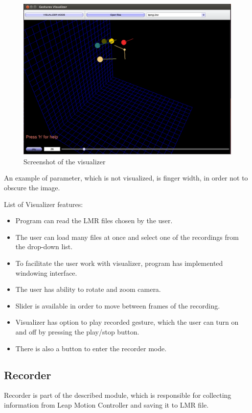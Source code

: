 \begin{figure}[htb]
\centering
 \includegraphics[width=1\columnwidth]{figures/visualizer.png}
 \caption{Screenshot of the visualizer}
 \label{visualizer}
\end{figure}

An example of parameter, which is not visualized, is finger width, in order not to obscure the image.

List of Visualizer features:
\begin{itemize}
\item Program can read the LMR files chosen by the user.
\item The user can load many files at once and select one of the recordings from the drop-down list.
\item To facilitate the user work with visualizer, program has implemented windowing interface.
\item The user has ability to rotate and zoom camera.
\item Slider is available in order to move between frames of the recording.
\item Visualizer has option to play recorded gesture, which the user can turn on and off by pressing the play/stop button.
\item There is also a button to enter the recorder mode.
\end{itemize}

\subsection{Recorder}
Recorder is part of the described module, which is responsible for collecting information from Leap Motion Controller and saving it to LMR file.

